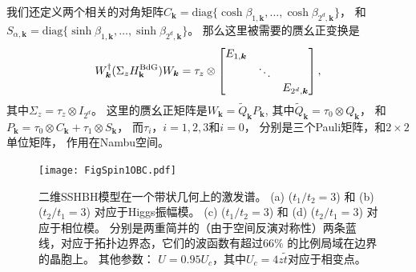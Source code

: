 我们还定义两个相关的对角矩阵$C_{\bm{k}} = \text{diag} \{ \cosh \beta_{1, \bm{k}}, \ldots, \cosh \beta_{2^d,\bm{k}} \}$，
和$S_{\alpha, \bm{k}} = \text{diag} \{ \sinh \beta_{1,\bm{k}}, \ldots, \sinh \beta_{2^d, \bm{k}} \}$。
那么这里被需要的赝幺正变换是
\begin{equation}
  W_{\bm{k}}^{ \dagger} (\Sigma_z H^{\text{BdG}}_{\vb k}) W_{\bm{k}}  = \tau_z \otimes \begin{bmatrix}
      E_{1, \bm{k}} & & \\
      & \ddots & \\
      & & E_{2^d,\bm{k}}
  \end{bmatrix},\label{put}
\end{equation}
其中$\Sigma_z=\tau_z\otimes I_{2^d}$。
这里的赝幺正矩阵是$W_{\bm{k}} = \tilde Q_{\bm{k}} P_{\bm{k}}$,
其中$\tilde Q_{\bm{k}}=\tau_0 \otimes Q_{\bm{k}}$，
和$P_{\bm{k}} = \tau_0 \otimes C_{\bm{k}} + \tau_1 \otimes S_{\bm{k}}$，
而$\tau_i$，$i=1,2,3$和$i=0$，
分别是三个Pauli矩阵，和$2\times 2$单位矩阵，
作用在Nambu空间。

\begin{figure}[t]
\centering
    \texttt{[image: FigSpin1OBC.pdf]}
    \caption{二维SSHBH模型在一个带状几何上的激发谱。
    (a) ($t_1/t_2=3$) 和 (b) ($t_2/t_1=3$) 对应于Higgs振幅模。
    (c) ($t_1/t_2=3$) 和 (d) ($t_2/t_1=3$) 对应于相位模。
    分别是两重简并的（由于空间反演对称性）两条蓝线，对应于拓扑边界态，它们的波函数有超过$66\%$ 的比例局域在边界的晶胞上。
    其他参数：
    $U=0.95 U_c$，其中$U_c=4z \tilde t$对应于相变点。}
    \label{spin1OBC}
\end{figure}


